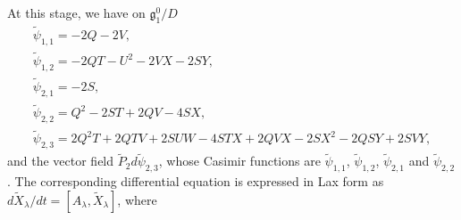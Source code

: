 \documentclass[10pt,a4paper]{amsart}
\numberwithin{equation}{section}
\begin{document}
At this stage, we have on $\mathfrak{g}^0_1/D$
\begin{gather*}
\widetilde{\psi}_{1,1} = -2Q - 2V, \\
\widetilde{\psi}_{1,2} = -2QT - U^2 - 2VX - 2SY, \\
\widetilde{\psi}_{2,1} = -2S, \\
\widetilde{\psi}_{2,2} = Q^2 - 2ST + 2QV- 4SX, \\
\widetilde{\psi}_{2,3} = 2Q^2T + 2QTV + 2SUW - 4STX+ 2QVX -2SX^2 - 2QSY + 2SVY,
\end{gather*}
and the vector f\/ield $\widetilde{P}_2d\widetilde{\psi}_{2,3}$, whose Casimir functions are $\widetilde{\psi}_{1,1}$, $\widetilde{\psi}_{1,2}$, $\widetilde{\psi}_{2,1}$ and $\widetilde{\psi}_{2,2}$. The corresponding dif\/ferential equation is expressed in Lax form as $d\widetilde{X}_\lambda /dt = [A_\lambda , \widetilde{X}_\lambda ]$, where
\end{document}
